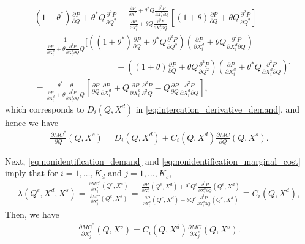 \documentclass[11pt, a4paper]{article}
\theoremstyle{remark}
\begin{document}
\begin{align}
    &(1+ \theta^{*})\frac{\partial P}{\partial Q} + \theta^{*} Q\frac{\partial^2 P}{\partial Q^2} - \frac{\frac{\partial P}{\partial X^{d}_i} + \theta^{*} Q\frac{\partial^2 P}{\partial X^{d}_{i}\partial Q} }{\frac{\partial P}{\partial X^{d}_i} + \theta Q\frac{\partial^2 P}{\partial X^{d}_{i}\partial Q} }\left[(1+ \theta) \frac{\partial P}{\partial Q} + \theta Q\frac{\partial^2 P}{\partial Q^2}\right]\\
    &= \frac{1}{\frac{\partial P}{\partial X^{d}_i} + \theta\frac{\partial^2 P}{\partial X^{d}_{i}\partial Q}Q}\Bigg[\left((1 + \theta^{*}) \frac{\partial P}{\partial Q} + \theta^{*} Q\frac{\partial^2 P}{\partial  Q^2}\right)\left(\frac{\partial P}{\partial X^{d}_i} + \theta Q\frac{\partial^2 P}{\partial X^{d}_{i}\partial Q}\right)\\
    &\hspace{4cm} - \left( (1 + \theta) \frac{\partial P}{\partial Q} + \theta Q\frac{\partial^2 P}{\partial Q^2}\right)\left(\frac{\partial P}{\partial X^{d}_i} + \theta^{*} Q\frac{\partial^2 P}{\partial X^{d}_{i}\partial Q}\right)\Bigg]\\
    & =  \frac{\theta^{*} - \theta}{\frac{\partial P}{\partial X^{d}_i} + \theta\frac{\partial^2 P}{\partial X^{d}_{i}\partial Q}Q}\left[ \frac{\partial P}{\partial Q} \frac{\partial P}{\partial X^{d}_i} + Q\frac{\partial P}{\partial X^{d}_i}\frac{\partial^2 P}{\partial^2 Q} - Q\frac{\partial P}{\partial Q}\frac{\partial^2 P}{\partial X^{d}_i \partial Q} \right],
\end{align}
which corresponds to $D_i(Q, X^{d})$ in \eqref{eq:intercation_derivative_demand}, and hence we have
\begin{align}
    \frac{\partial MC^{*}}{\partial Q}(Q, X^{s}) = D_i(Q, X^{d}) + C_i(Q, X^{d})\frac{\partial MC}{\partial Q}(Q, X^{s}).
\end{align}

Next, \eqref{eq:nonidentification_demand} and \eqref{eq:nonidentification_marginal_cost} imply that for $i = 1, \ldots, K_d$ and $j = 1, \ldots, K_s$,
\begin{align}
    \lambda(Q^e, X^{d}, X^{s}) =  \frac{\frac{\partial MC^{*}}{\partial X^{s}_j}(Q^e, X^{s})}{\frac{\partial MC}{\partial X^{s}_j}(Q^e, X^{s})} =  \frac{\frac{\partial P}{\partial X^{d}_i}(Q^e, X^{d}) + \theta^{*} Q^e\frac{\partial^2 P}{\partial X^{d}_{i}\partial Q}(Q^e, X^{d}) }{\frac{\partial P}{\partial X^{d}_i}(Q^e, X^{d}) + \theta Q^e\frac{\partial^2 P}{\partial X^{d}_{i}\partial Q}(Q^e, X^{d})} \equiv C_i(Q, X^{d}),
\end{align}
Then, we have 
\begin{align}
    \frac{\partial MC^{*}}{\partial X^{s}_j}(Q, X^{s}) = C_i(Q, X^{d}) \frac{\partial MC}{\partial X^{s}_j}(Q, X^{s}).
\end{align}
\end{document}
